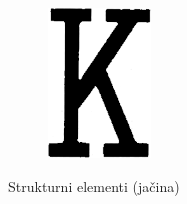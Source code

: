 \documentclass[times, zavrsni, numeric, utf8]{fer}
\begin{document}
\begin{figure}[H]
\begin{subfigure}[b]{0.15\textwidth}
					\includegraphics[width=\textwidth]{templates-rank/image24.png}
					\caption{}
				\end{subfigure}
				\caption{Strukturni elementi (jačina)}
				\label{fig:patterns}
			\end{figure}
\end{document}
